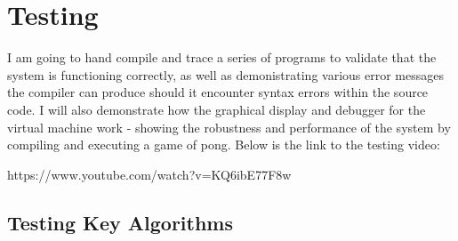 \section{Testing}
I am going to hand compile and trace a series of programs to validate that the system is functioning correctly, as well as demonistrating various error messages the compiler can produce should it encounter syntax errors within the source code. I will also demonstrate how the graphical display and debugger for the virtual machine work - showing the robustness and performance of the system by compiling and executing a game of pong. Below is the link to the testing video:

https://www.youtube.com/watch?v=KQ6ibE77F8w

 

\subsection{Testing Key Algorithms}